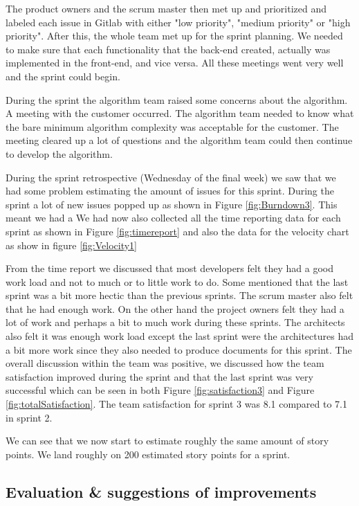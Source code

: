 \documentclass{article}
\begin{document}
The product owners and the scrum master then met up and prioritized and labeled each issue in Gitlab with either "low priority", "medium priority" or "high priority". After this, the whole team met up for the sprint planning. We needed to make sure that each functionality that the back-end created, actually was implemented in the front-end, and vice versa. All these meetings went very well and the sprint could begin. 

During the sprint the algorithm team raised some concerns about the algorithm. A meeting with the customer occurred. The algorithm team needed to know what the bare minimum algorithm complexity was acceptable for the customer. The meeting cleared up a lot of questions and the algorithm team could then continue to develop the algorithm. 

During the sprint retrospective (Wednesday of the final week) we saw that we had some problem estimating the amount of issues for this sprint. During the sprint a lot of new issues popped up as shown in Figure \ref{fig:Burndown3}. %
This meant we had a %
We had now also collected all the time reporting data for each sprint as shown in Figure \ref{fig:timereport} and also the data for the velocity chart as show in figure \ref{fig:Velocity1} %

From the time report we discussed that most developers felt they had a good work load and not to much or to little work to do. Some mentioned that the last sprint was a bit more hectic than the previous sprints. The scrum master also felt that he had enough work. On the other hand the project owners felt they had a lot of work and perhaps a bit to much work during these sprints. The architects also felt it was enough work load except the last sprint were the architectures had a bit more work since they also needed to produce documents for this sprint. The overall discussion within the team was positive, we discussed how the team satisfaction improved during the sprint and that the last sprint was very successful which can be seen in both Figure \ref{fig:satisfaction3} and Figure \ref{fig:totalSatisfaction}. The team satisfaction for sprint 3 was 8.1 compared to 7.1 in sprint 2. 

We can see that we now start to estimate roughly the same amount of story points. We land roughly on 200 estimated story points for a sprint. 


\subsection{Evaluation \& suggestions of improvements}
\end{document}
